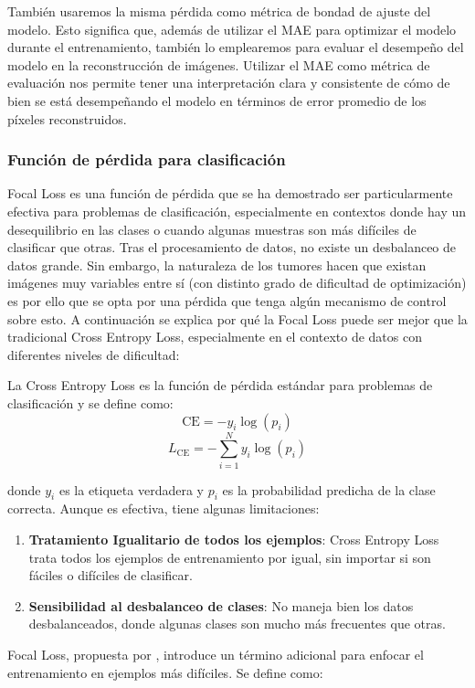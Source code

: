 También usaremos la misma pérdida como métrica de bondad de ajuste del modelo. Esto significa que, además de utilizar el MAE para optimizar el modelo durante el entrenamiento, también lo emplearemos para evaluar el desempeño del modelo en la reconstrucción de imágenes. Utilizar el MAE como métrica de evaluación nos permite tener una interpretación clara y consistente de cómo de bien se está desempeñando el modelo en términos de error promedio de los píxeles reconstruidos.

\subsubsection{Función de pérdida para clasificación}

Focal Loss es una función de pérdida que se ha demostrado ser particularmente efectiva para problemas de clasificación, especialmente en contextos donde hay un desequilibrio en las clases o cuando algunas muestras son más difíciles de clasificar que otras. Tras el procesamiento de datos, no existe un desbalanceo de datos grande. Sin embargo, la naturaleza de los tumores hacen que existan imágenes muy variables entre sí (con distinto grado de dificultad de optimización) es por ello que se opta por una pérdida que tenga algún mecanismo de control sobre esto. A continuación se explica por qué la Focal Loss puede ser mejor que la tradicional Cross Entropy Loss, especialmente en el contexto de datos con diferentes niveles de dificultad:

La Cross Entropy Loss es la función de pérdida estándar para problemas de clasificación y se define como:
$$  {\text{CE}} = - y_i \log(p_i) $$
$$  L_{\text{CE}} = - \sum_{i=1}^N y_i \log(p_i) $$

donde $y_i$ es la etiqueta verdadera y $p_i$ es la probabilidad predicha de la clase correcta. Aunque es efectiva, tiene algunas limitaciones:
\begin{enumerate}
	\item \textbf{Tratamiento Igualitario de todos los ejemplos}: Cross Entropy Loss trata todos los ejemplos de entrenamiento por igual, sin importar si son fáciles o difíciles de clasificar.
	\item \textbf{Sensibilidad al desbalanceo de clases}: No maneja bien los datos desbalanceados, donde algunas clases son mucho más frecuentes que otras.
\end{enumerate}

Focal Loss, propuesta por \cite{lin2017focal}, introduce un término adicional para enfocar el entrenamiento en ejemplos más difíciles. Se define como:

